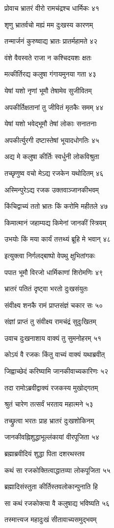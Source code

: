 प्रोवाच भ्रातरं वीरो रामचंद्रश्च धार्मिकः ४१

शृणु भ्रातर्वचो मह्यं मम दुःखस्य कारणम्

तन्मार्जनं कुरुष्वाद्य भ्रातः प्रातर्महामते ४२

वंशे वैवस्वते राजा न कश्चिदयशः क्षतः

मत्कीर्तिरद्य कलुषा गंगायमुनया गता ४३

येषां यशो नृणां भूमौ तेषामेव सुजीवितम्

अपकीर्तिक्षतानां तु जीवितं मृतकैः समम् ४४

येषां यशो भवेद्भूमौ तेषां लोकाः सनातनाः

अपकीर्त्युरगी दष्टास्तेषां भूयादधोगतिः ४५

अद्य मे कलुषा कीर्तिः स्वर्धुनी लोकविश्रुता

तच्छृणुष्व वचो मेऽद्य रजकेन यथोदितम् ४६

अस्मिन्पुरेऽद्य रजक उक्तवाञ्जानकीभवम्

किंचिद्वाच्यं ततो भ्रातः किं करोमि महीतले ४७

किमात्मानं जहाम्यद्य किमेनां जानकीं स्त्रियम्

उभयोः किं मया कार्यं तत्तथ्यं ब्रूहि मे भवान् ४८

इत्युक्त्वा निर्गलद्बाष्पो वेपथु क्षुभितांगकः

पपात भूमौ विरजो धार्मिकाणां शिरोमणिः ४९

भ्रातरं पतितं दृष्ट्वा भरतो दुःखसंयुतः

संवीक्ष्य शनकै रामं प्राप्तसंज्ञं चकार सः ५०

संज्ञां प्राप्तं तु संवीक्ष्य रामचंद्रं सुदुःखितम्

उवाच दुःखनाशाय वाक्यं तु सुमनोहरम् ५१

कोऽयं वै रजकः किंतु वाच्यं वाक्यं यथाब्रवीत्

जिह्वाच्छेदं करिष्यामि जानकीवाच्यकारिणः ५२

तदा रामोऽब्रवीद्वाक्यं रजकस्य मुखोद्गतम्

श्रुतं चारेण तत्सर्वं भरताय महात्मने ५३

तच्छ्रुत्वा भरतः प्राह भ्रातरं दुःखशोकिनम्

जानकीवह्निशुद्धाभूल्लंकायां वीरपूजिता ५४

ब्रह्माब्रवीदियं शुद्धा पिता दशरथस्तव

कथं सा रजकोक्तित्वाद्धातव्या लोकपूजिता ५५

ब्रह्मादिसंस्तुता कीर्तिस्तवलोकान्पुनाति हि

सा कथं रजकोक्त्या वै कलुषाद्य भविष्यति ५६

तस्मात्त्यज महादुःखं सीतावाच्यसमुद्भवम्

